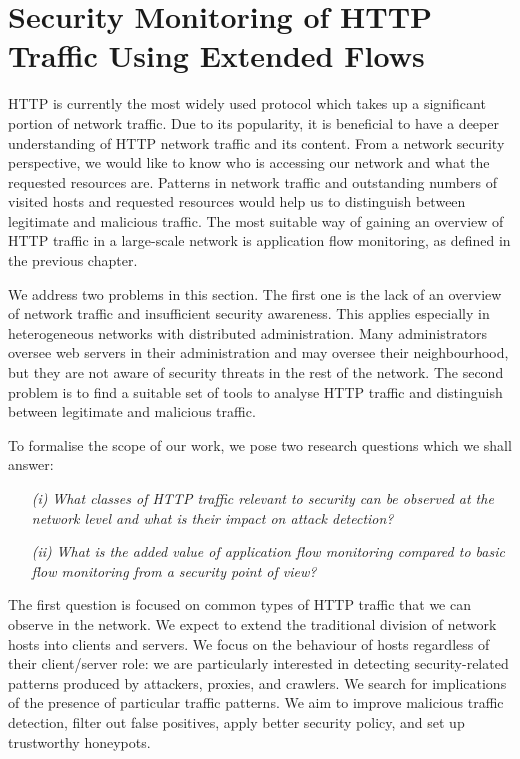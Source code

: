 \newpage

\section{Security Monitoring of HTTP Traffic Using Extended Flows}\label{sec:analysis-http-flows}

HTTP is currently the most widely used protocol which takes up a significant portion of network traffic. Due to its popularity, it is beneficial to have a deeper understanding of HTTP network traffic and its content. From a network security perspective, we would like to know who is accessing our network and what the requested resources are. Patterns in network traffic and outstanding numbers of visited hosts and requested resources would help us to distinguish between legitimate and malicious traffic. The most suitable way of gaining an overview of HTTP traffic in a large-scale network is application flow monitoring, as defined in the previous chapter.

We address two problems in this section. The first one is the lack of an overview of network traffic and insufficient security awareness. This applies especially in heterogeneous networks with distributed administration. Many administrators oversee web servers in their administration and may oversee their neighbourhood, but they are not aware of security threats in the rest of the network. The second problem is to find a suitable set of tools to analyse HTTP traffic and distinguish between legitimate and malicious traffic.

To formalise the scope of our work, we pose two research questions which we shall answer:
\begin{itemize}
\item[\emph{(i)}] \emph{What classes of HTTP traffic relevant to security can be observed at the network level and what is their impact on attack detection?}
\item[\emph{(ii)}] \emph{What is the added value of application flow monitoring compared to basic flow monitoring from a security point of view?}
\end{itemize}

The first question is focused on common types of HTTP traffic that we can observe in the network. We expect to extend the traditional division of network hosts into clients and servers. We focus on the behaviour of hosts regardless of their client/server role: we are particularly interested in detecting security-related patterns produced by attackers, proxies, and crawlers. We search for implications of the presence of particular traffic patterns. We aim to improve malicious traffic detection, filter out false positives, apply better security policy, and set up trustworthy honeypots.

